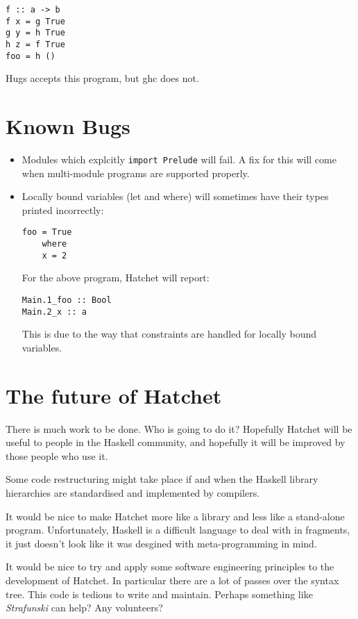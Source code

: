 \documentclass{article}
\begin{document}
\begin{verbatim}
f :: a -> b
f x = g True
g y = h True
h z = f True
foo = h () 
\end{verbatim}

Hugs accepts this program, but ghc does not.

\section{Known Bugs}

\begin{itemize}
\item Modules which explcitly \texttt{import Prelude} will fail. A fix for
      this will come when multi-module programs are supported properly.
\item Locally bound variables (let and where) will sometimes have their
      types printed incorrectly:
\begin{verbatim}       
foo = True
    where
    x = 2
\end{verbatim}
      For the above program, Hatchet will report:
\begin{verbatim}       
Main.1_foo :: Bool
Main.2_x :: a
\end{verbatim}
      This is due to the way that constraints are handled for
      locally bound variables. 
\end{itemize}

\section{The future of Hatchet}

There is much work to be done. Who is going to do it? Hopefully
Hatchet will be useful to people in the Haskell community, and
hopefully it will be improved by those people who use it. 

Some code restructuring might take place if and when the Haskell library
hierarchies are standardised and implemented by compilers.

It would be nice to make Hatchet more like a library and less like
a stand-alone program. Unfortunately, Haskell is a difficult language to
deal with in fragments, it just doesn't look like it was desgined
with meta-programming in mind. 

It would be nice to try and apply some software engineering principles
to the development of Hatchet. In particular there are a lot of 
passes over the syntax tree. This code is tedious to write and maintain.
Perhaps something like \emph{Strafunski} can help? Any volunteers?
\end{document}
